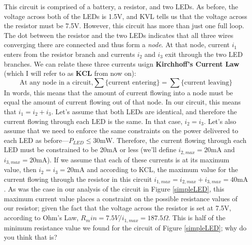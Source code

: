 This circuit is comprised of a battery, a resistor, and two LEDs. As before, the voltage across both of the LEDs is 1.5V, and KVL tells us that the voltage across the resistor must be 7.5V. However, this circuit has more than just one full loop. The dot between the resistor and the two LEDs indicates that all three wires converging there are connected and thus form a \textit{node}. At that node, current $i_1$ enters from the resistor branch and currents $i_2$ and $i_3$ exit through the two LED branches. We can relate these three currents usign \textbf{Kirchhoff's Current Law} (which I will refer to as \textbf{KCL} from now on): 
$$
\textrm{At any node in a circuit,} \sum\textrm{\{current entering\}} = \sum\textrm{\{current leaving\}}
$$
In words, this means that the amount of current flowing into a node must be equal the amount of current flowing out of that node. In our circuit, this means that $i_1=i_2+i_3$. Let's assume that both LEDs are identical, and therefore the current flowing through each LED is the same. In that case, $i_2=i_3$. Let's also assume that we need to enforce the same constraints on the power delivered to each LED as before---$P_{LED}\leq30\textrm{mW}$. Therefore, the current flowing through each LED must be constrained to be 20mA or less (we'll define $i_{2,max}=20\textrm{mA}$ and $i_{3,max}=20\textrm{mA}$). If we assume that each of these currents is at its maximum value, then $i_2=i_3=20\textrm{mA}$ and according to KCL, the maximum value for the current flowing through the resistor in this circuit $i_{1,max}=i_{2,max}+i_{3,max}=40\textrm{mA}$. As was the case in our analysis of the circuit in Figure \ref{simpleLED}, this maximum current value places a constraint on the possible resistance values of our resistor; given the fact that the voltage across the resistor is set at 7.5V, according to Ohm's Law, $R_min=7.5V/i_{1,max}=187.5\Omega$. This is half of the minimum resistance value we found for the circuit of Figure \ref{simpleLED}; why do you think that is?
